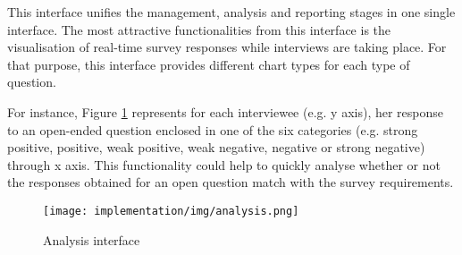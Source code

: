 	This interface unifies the management, analysis and reporting stages in one single interface. The most attractive functionalities from this interface is the visualisation of real-time survey responses while interviews are taking place. For that purpose, this interface provides different chart types for each type of question. 

	For instance, Figure \ref{fig:impl:analysisInterface} represents for each interviewee (e.g. y axis), her response to an open-ended question enclosed in one of the six categories (e.g. strong positive, positive, weak positive, weak negative, negative or strong negative) through x axis. This functionality could help to quickly analyse whether or not the responses obtained for an open question match with the survey requirements.

	\begin{figure}[h]
	\centering
	\texttt{[image: implementation/img/analysis.png]}
	\caption{Analysis interface}
	\label{fig:impl:analysisInterface}
	\end{figure}